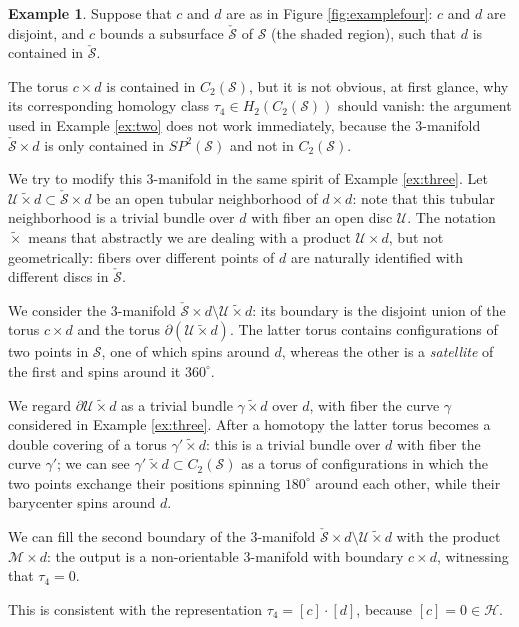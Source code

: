 \documentclass{amsart}
\theoremstyle{plain}
\theoremstyle{definition}
\newtheorem{ex}{Example}
\renewcommand{\H}{\mathcal{H}}
\newcommand{\M}{\mathcal{M}}
\renewcommand{\S}{\mathcal{S}}
\newcommand{\U}{\mathcal{U}}
\newcommand{\pa}[1]{\left(#1\right)}
\newcommand{\SP}{S\!P}
\begin{document}
\begin{ex}
 \label{ex:four}
 Suppose that $c$ and $d$ are as in Figure \ref{fig:examplefour}: $c$ and $d$ are disjoint, and
 $c$ bounds a subsurface $\check{\S}$ of $\S$ (the shaded region), such that $d$ is contained in $\check{\S}$.
 
 The torus $c\times d$ is contained in $C_2(\S)$, but it is not obvious, at first glance, why its corresponding homology
 class $\tau_4\in H_2(C_2(\S))$ should vanish: the argument used in Example \ref{ex:two} does not work immediately, because the
 3-manifold $\check{\S}\times d$ is only contained in $\SP^2(\S)$ and not in $C_2(\S)$.
 
 We try to modify this 3-manifold in the same spirit of Example \ref{ex:three}. Let $\U\tilde{\times} d\subset \check{\S}\times d$
 be an open tubular neighborhood of $d\times d$: note that this tubular neighborhood is a trivial bundle over
 $d$ with fiber an open disc $\U$. The notation $\tilde{\times}$ means that abstractly we are dealing with a product $\U\times d$,
 but not geometrically: fibers over different points of $d$ are naturally identified with different discs in $\check{\S}$.
 
 We consider the 3-manifold $\check{\S}\times d\setminus \U\tilde{\times} d$: its boundary is the disjoint union
 of the torus $c\times d$ and the torus $\partial \pa{\U\tilde{\times} d}$. The latter torus contains configurations of
 two points in $\S$, one of which spins around $d$, whereas the other is a \emph{satellite} of the first and spins
 around it $360^{\circ}$.
 
 We regard $\partial \U\tilde{\times} d$ as a trivial bundle $\gamma\tilde{\times} d$ over $d$, with fiber the curve $\gamma$
 considered in Example \ref{ex:three}. After a homotopy the latter torus
 becomes a double covering of a torus $\gamma'\tilde{\times} d$: this is a trivial bundle over $d$ with fiber the curve $\gamma'$;
 we can see $\gamma'\tilde{\times} d\subset C_2(\S)$ as a torus of configurations in which the two points
 exchange their positions spinning $180^{\circ}$ around each other, while their barycenter spins around $d$.
 
 We can fill the second boundary of the $3$-manifold $\check{\S}\times d\setminus \U\tilde{\times} d$
 with the product $\M\times d$: the output is a non-orientable $3$-manifold with boundary $c\times d$, witnessing
 that $\tau_4=0$.
 
 This is consistent with the representation $\tau_4=[c]\cdot[d]$, because $[c]=0\in \H$.
\end{ex}
\end{document}
